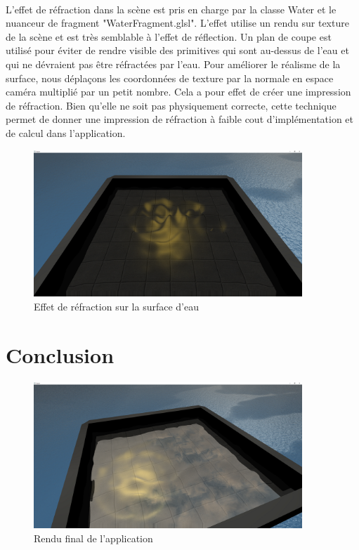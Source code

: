 \documentclass[a4paper, 12pt]{article} %
\begin{document}
	\paragraph{}
	L'effet de réfraction dans la scène est pris en charge par la classe Water et le nuanceur de fragment "WaterFragment.glsl". L'effet utilise un rendu sur 
	texture de la scène et est très semblable à l'effet de réflection. Un plan de coupe est utilisé pour éviter de rendre visible des primitives qui sont au-dessus
	de l'eau et qui ne dévraient pas être réfractées par l'eau. Pour améliorer le réalisme de la surface, nous déplaçons les coordonnées de texture par la normale 
	en espace caméra multiplié par un petit nombre. Cela a pour effet de créer une impression de réfraction. Bien qu'elle ne soit pas physiquement correcte, cette
	technique permet de donner une impression de réfraction à faible cout d'implémentation et de calcul dans l'application.
\begin{figure}
	\centering
	\includegraphics[width=0.9\textwidth]{./PhotoRapport/Refraction.png}
	\caption{Effet de réfraction sur la surface d'eau}
	\label{Refractopm}
\end{figure}
\section{Conclusion}
\begin{figure}
	\centering
	\includegraphics[width=0.9\textwidth]{./PhotoRapport/EffetFinal.png}
	\caption{Rendu final de l'application}
	\label{EffetFinal}
\end{figure}
\end{document}
